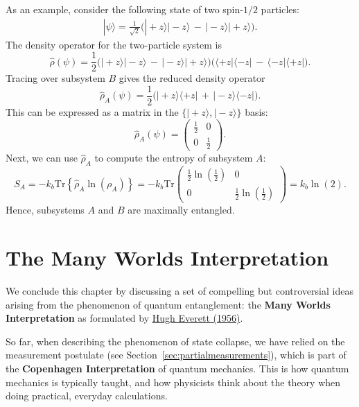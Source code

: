 \documentclass[pra,12pt]{revtex4}
\begin{document}
As an example, consider the following state of two spin-$1/2$ particles:
\begin{align}
  |\psi\rangle = \frac{1}{\sqrt{2}} \Big(|\!+\!z\rangle|\!-\!z\rangle \,-\, |\!-\!z\rangle|\!+\!z\rangle\Big).
\end{align}
The density operator for the two-particle system is
\begin{equation}
  \hat{\rho}(\psi) = \frac{1}{2} \Big(|\!+\!z\rangle|\!-\!z\rangle \,-\, |\!-\!z\rangle|\!+\!z\rangle\Big) \Big(\langle+z|\langle-z| \,-\, \langle-z|\langle+z|\Big).
\end{equation}
Tracing over subsystem $B$ gives the reduced density operator
\begin{equation}
  \hat{\rho}_A(\psi) = \frac{1}{2} \Big(|\!+\!z\rangle \langle+z| \,+\, |\!-\!z\rangle \langle-z|\Big).
\end{equation}
This can be expressed as a matrix in the
$\{|\!+z\rangle,|\!-z\rangle\}$ basis:
\begin{equation}
  \hat{\rho}_A(\psi) = \begin{pmatrix}\frac{1}{2} & 0 \\ 0 & \frac{1}{2}\end{pmatrix}.
\end{equation}
Next, we can use $\hat{\rho}_A$ to compute the entropy of subsystem $A$:
\begin{equation}
  S_A = -k_b\mathrm{Tr}\left\{\hat{\rho}_A\ln(\rho_A)\right\} = -k_b\mathrm{Tr}\begin{pmatrix}\frac{1}{2}\ln\left(\frac{1}{2}\right) & 0 \\ 0 & \frac{1}{2}\ln\left(\frac{1}{2}\right)\end{pmatrix} = k_b\ln(2).
\end{equation}
Hence, subsystems $A$ and $B$ are maximally entangled.

\section{The Many Worlds Interpretation}

We conclude this chapter by discussing a set of compelling but
controversial ideas arising from the phenomenon of quantum
entanglement: the \textbf{Many Worlds Interpretation} as formulated by
\hyperref[cite:everett]{Hugh Everett (1956)}.

So far, when describing the phenomenon of state collapse, we have
relied on the measurement postulate (see
Section~\ref{sec:partialmeasurements}), which is part of the
\textbf{Copenhagen Interpretation} of quantum mechanics.  This is how
quantum mechanics is typically taught, and how physicists think about
the theory when doing practical, everyday calculations.
\end{document}

